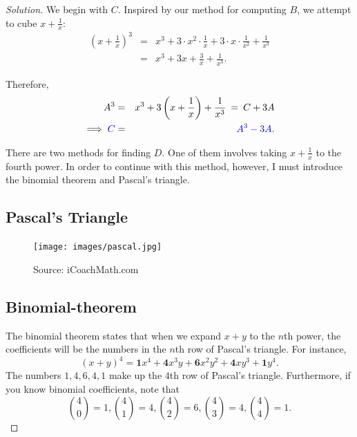 \begin{proof}[Solution]
	
We begin with $C$. Inspired by our method for computing $B$, we attempt to cube $x+\frac{1}{x}$: \begin{eqnarray*} (x+\frac{1}{x})^3&=&x^3+3\cdot x^2\cdot \frac{1}{x}+3\cdot x\cdot \frac{1}{x^2}+\frac{1}{x^3} \\ &=& x^3+3x+\frac{3}{x}+\frac{1}{x^3}. \end{eqnarray*} 
\clearpage

Therefore, \begin{eqnarray*} A^3&=&x^3+3\left(x+\frac{1}{x}\right)+\frac{1}{x^3} \:=\:C+3A \\ \implies \color{blue} C &=& \color{blue} A^3-3A. \end{eqnarray*}

There are two methods for finding $D$. One of them involves taking $x+\frac{1}{x}$ to the fourth power. In order to continue with this method, however, I must introduce the binomial theorem and Pascal's triangle.  

\clearpage
\subsection{Pascal's Triangle}

\begin{figure}[h]
	\centering\texttt{[image: images/pascal.jpg]}
	\caption{Source:  iCoachMath.com}
\end{figure}

\clearpage

\subsection{Binomial-theorem}
The binomial theorem states that when we expand $x+y$ to the $n$th power, the coefficients will be the numbers in the $n$th row of Pascal's triangle. For instance, $$(x+y)^4=\textbf{1}x^4+\textbf{4}x^3y+\textbf{6}x^2y^2+\textbf{4}xy^3+\textbf{1}y^4.$$
The numbers $1, 4, 6, 4, 1$ make up the $4$th row of Pascal's triangle. Furthermore, if you know binomial coefficients, note that $$\binom{4}{0}=1, \binom{4}{1}=4, \binom{4}{2}=6, \binom{4}{3}=4, \binom{4}{4}=1.$$



\end{proof}
